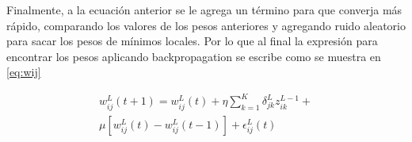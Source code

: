 \documentclass[a4paper,12pt,twocolumn]{article}
\begin{document}
  Finalmente, a la ecuación anterior se le agrega un término para que converja
  más rápido, comparando los valores de los pesos anteriores y agregando ruido
  aleatorio para sacar los pesos de mínimos locales. Por lo que al final la
  expresión para encontrar los pesos aplicando backpropagation se escribe como
  se muestra en \ref{eq:wij}

  \begin{equation}
  \begin{split}
    w_{ij}^{L}(t+1) = w_{ij}^{L}(t) + \eta
    \sum_{k=1}^{K}\delta_{jk}^{L}z_{ik}^{L-1} + \\
    \mu[w_{ij}^{L}(t) - w_{ij}^{L}(t-1)] + \epsilon_{ij}^{L}(t)
  \end{split}\label{eq:wij}
  \end{equation}

  \nocite{*} %

  

\end{document}
